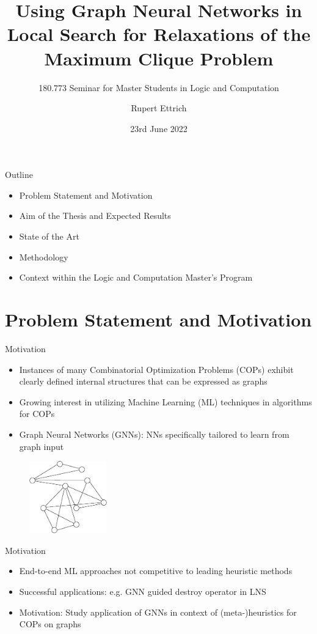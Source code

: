 \documentclass{beamer}
\title{Using Graph Neural Networks in Local Search for Relaxations of the Maximum Clique Problem}
\subtitle{180.773 Seminar for Master Students in Logic and Computation}
\author{Rupert Ettrich}
\date{23rd June 2022}
\begin{document}
\maketitle

\begin{frame}{Outline}
\begin{itemize}
    \item Problem Statement and Motivation
    \item Aim of the Thesis and Expected Results
    \item State of the Art
    \item Methodology
    \item Context within the Logic and Computation Master's Program
\end{itemize}
    
\end{frame}

\section{Problem Statement and Motivation}

\begin{frame}{Motivation}
    \begin{itemize}
        \item<1-> Instances of many Combinatorial Optimization Problems (COPs) exhibit clearly defined internal structures that can be expressed as graphs
        \item<2-> Growing interest in utilizing Machine Learning (ML) techniques in algorithms for COPs
        \item<3-> Graph Neural Networks (GNNs): NNs specifically tailored to learn from graph input 
    \end{itemize}
\begin{figure}
    \centering
    \includegraphics[width=0.3\textwidth]{graphics/graph1.eps}
\end{figure}
\end{frame}

\begin{frame}{Motivation}
    \begin{itemize}
        \item<1-> End-to-end ML approaches not competitive to leading heuristic methods
        \item<2-> Successful applications: e.g. GNN guided destroy operator in LNS \cite{Oberweger2022}
        \item<3-> Motivation: Study application of GNNs in context of (meta-)heuristics for COPs on graphs
    \end{itemize}
\end{frame}
\end{document}
